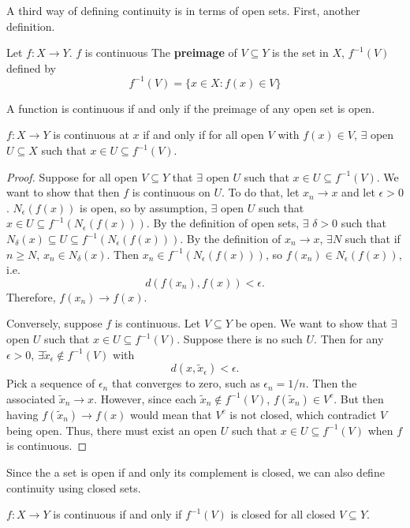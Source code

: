 A third way of defining continuity is in terms of open sets. First,
another definition.
\begin{definition}
  Let $f: X \to Y$. $f$ is continuous The \textbf{preimage} of $V \subseteq Y$ is the
  set in $X$, $f^{-1}(V)$ defined by
  \[ f^{-1} (V) = \{ x \in X: f(x) \in V \} \]
\end{definition}
A function is continuous if and only if the preimage of any open set
is open. 
\begin{lemma}\label{lem:copen}
  $f:X \to Y$ is continuous at $x$ if and only if for all open $V$
  with $f(x) \in V$,
  $\exists$ open $U \subseteq X$ such that $x \in U \subseteq f^{-1}(V)$.
\end{lemma}
\begin{proof}
  Suppose for all open $V \subseteq Y$ that $\exists$ open $U$ such
  that $x \in U \subseteq f^{-1}(V)$. We want to show that then $f$ is
  continuous on $U$. To do that, let $x_n \to x$ and let
  $\epsilon>0$. $N_\epsilon(f(x))$ is open, so by assumption,
  $\exists$ open $U$ such that
  $x \in U \subseteq f^{-1}(N_{\epsilon}(f(x)))$. By the definition of
  open sets, $\exists$ $\delta > 0$ such that
  $N_{\delta}(x) \subseteq U \subseteq f^{-1}(N_{\epsilon}(f(x)))$. By
  the definition of $x_n \to x$, $\exists N$ such that if $n \geq N$,
  $x_n \in N_{\delta}(x)$. Then $x_n \in f^{-1}(N_{\epsilon}(f(x)))$,
  so $f(x_n) \in N_{\epsilon}(f(x))$, i.e.
  \[ d\left(f(x_n),f(x) \right) < \epsilon. \]
  Therefore, $f(x_n) \to f(x)$. 

  Conversely, suppose $f$ is continuous. Let $V \subseteq Y$ be
  open. We want to show that $\exists$ open $U$ such that
  $x \in U \subseteq f^{-1}(V)$. Suppose there is no such $U$. Then
  for any $\epsilon > 0$,
  $\exists \tilde{x}_{\epsilon} \not\in f^{-1}(V)$ with
  \[ d(x,\tilde{x}_{\epsilon}) < \epsilon. \]
  Pick a sequence of $\epsilon_n$ that converges to zero, such as
  $\epsilon_n = 1/n$. Then the associated $\tilde{x}_n \to
  x$. However, since each $\tilde{x}_n \not\in f^{-1}(V)$,
  $f(\tilde{x}_n) \in V^c$. But then having $f(\tilde{x}_n) \to f(x)$
  would mean that $V^c$ is not closed, which contradict $V$ being
  open. Thus, there must exist an open $U$ such that $x \in U
  \subseteq f^{-1}(V)$  when $f$ is continuous.
\end{proof}
Since the a set is open if and only its complement is closed, we can
also define continuity using closed sets.
\begin{corollary}
  $f:X \to Y$ is continuous if and only if $f^{-1}(V)$ is closed for all
  closed $V \subseteq Y$. 
\end{corollary}
